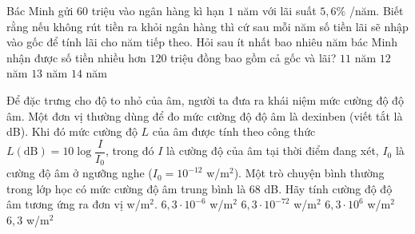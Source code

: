 \begin{ex}%
	Bác Minh gửi $60$ triệu vào ngân hàng kì hạn $ 1 $  năm với lãi suất $5{,}6\% $ /năm. Biết rằng nếu không rút tiền ra khỏi ngân hàng thì cứ sau mỗi năm số tiền lãi sẽ nhập vào gốc để tính lãi cho năm tiếp theo. Hỏi sau ít nhất bao nhiêu năm bác Minh nhận được số tiền nhiều hơn $120$ triệu đồng bao gồm cả gốc và lãi?
	\choice 
		{$11$ năm} 
		{$12$  năm}
		{\True $13$  năm}
		{$14$ năm} 
\end{ex}

\begin{ex}%
	Để đặc trưng cho độ to nhỏ của âm, người ta đưa ra khái niệm mức cường độ độ âm. Một đơn vị thường dùng để đo mức cường độ độ âm là dexinben (viết tắt là dB). Khi đó mức cường độ $L$ của âm được tính theo công thức $L(\text{dB}) = 10\log\dfrac{I}{I_0}$, trong đó $I$ là  cường độ của âm tại thời điểm đang xét, $I_0$ là cường độ âm ở ngưỡng nghe ($I_0 = 10^{-12}$ w/m$^2$). Một trò chuyện bình thường trong lớp học có mức cường độ âm trung bình là $68$ dB. Hãy tính cường độ độ âm tương ứng ra đơn vị w/m$^2$.
	 \choice
		{\True $6{,}3\cdot  10^{-6}$ w/m$^2$}
		{$6{,}3\cdot  10^{-72}$ w/m$^2$}
		 {$6{,}3\cdot 10^{6}$ w/m$^2$}
		{$6{,}3$  w/m$^2$}
\end{ex}

